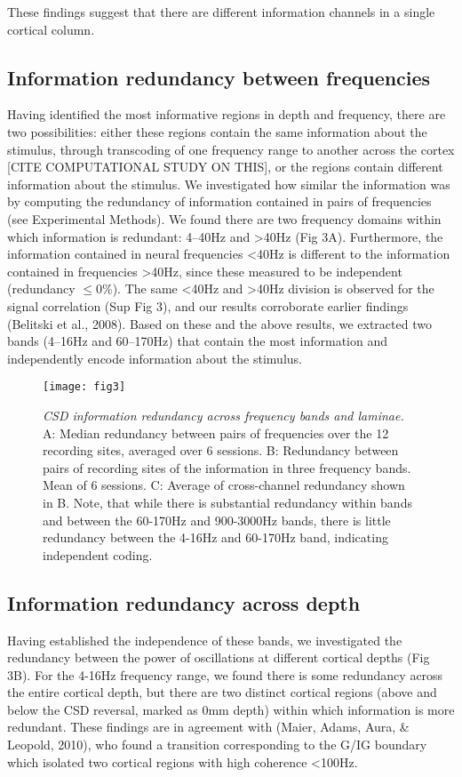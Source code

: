 These findings suggest that there are different information channels in a single cortical column.

\subsection{Information redundancy between frequencies}
Having identified the most informative regions in depth and frequency, there are two possibilities: either these regions contain the same information about the stimulus, through transcoding of one frequency range to another across the cortex [CITE COMPUTATIONAL STUDY ON THIS], or the regions contain different information about the stimulus.
We investigated how similar the information was by computing the redundancy of information contained in pairs of frequencies (see Experimental Methods).
We found there are two frequency domains within which information is redundant: 4--40Hz and {\textgreater}40Hz (Fig 3A).
Furthermore, the information contained in neural frequencies {\textless}40Hz is different to the information contained in frequencies {\textgreater}40Hz, since these measured to be independent (redundancy ${\leq}$0\%).
The same {\textless}40Hz and {\textgreater}40Hz division is observed for the signal correlation (Sup Fig 3), and our results corroborate earlier findings (Belitski et al., 2008).
Based on these and the above results, we extracted two bands (4--16Hz and 60--170Hz) that contain the most information and independently encode information about the stimulus.

\begin{figure}[htbp]
\centering \texttt{[image: fig3]}
%
\caption{%
\textit{\ac{CSD} information redundancy across frequency bands and laminae.}
A: Median redundancy between pairs of frequencies over the 12 recording 
sites, averaged over 6 sessions.
B: Redundancy between pairs of recording sites of the information in three 
frequency bands.
Mean of 6 sessions.
C: Average of cross-channel redundancy shown in B.
Note, that while there is substantial redundancy within bands and between the 
60-170Hz and 900-3000Hz bands, there is little redundancy between the 4-16Hz and
60-170Hz band, indicating independent coding.}%
\label{fig:lam_3}
%
\end{figure}

\subsection{Information redundancy across depth}
Having established the independence of these bands, we investigated the redundancy between the power of oscillations at different cortical depths (Fig 3B).
For the 4-16Hz frequency range, we found there is some redundancy across the entire cortical depth, but there are two distinct cortical regions (above and below the \ac{CSD} reversal, marked as 0mm depth) within which information is more redundant.
These findings are in agreement with (Maier, Adams, Aura, \& Leopold, 2010), who found a transition corresponding to the \ac{G}/\ac{IG} boundary which isolated two cortical regions with high coherence {\textless}100Hz.

